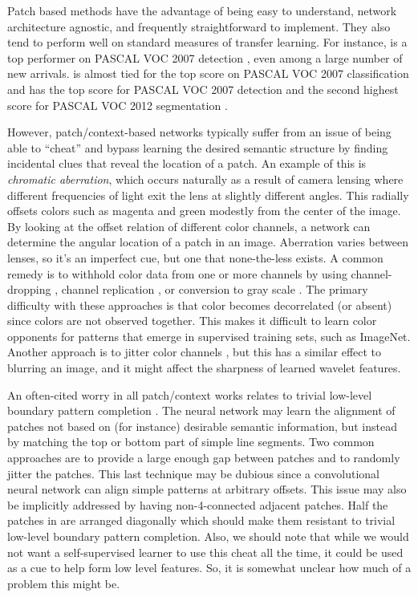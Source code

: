 \documentclass[10pt,twocolumn,letterpaper]{article}
\begin{document}
Patch based methods have the advantage of being easy to understand, network architecture agnostic, and frequently straightforward to implement. They also tend to perform well on standard measures of transfer learning. For instance, \cite{Doersch15} is a top performer on PASCAL VOC 2007 detection \cite{Girshick15}, even among a large number of new arrivals. \cite{Noroozi16b} is almost tied for the top score on PASCAL VOC 2007 classification \cite{Krahenbuhl16} and has the top score for PASCAL VOC 2007 detection and the second highest score for PASCAL VOC 2012 segmentation \cite{Long15,Pathak16}.

However, patch/context-based networks typically suffer from an issue of being able to ``cheat'' and bypass learning the desired semantic structure by finding incidental clues that reveal the location of a patch. An example of this is \emph{chromatic aberration}, which occurs naturally as a result of camera lensing where different frequencies of light exit the lens at slightly different angles. This radially offsets colors such as magenta and green modestly from the center of the image. By looking at the offset relation of different color channels, a network can determine the angular location of a patch in an image. Aberration varies between lenses, so it's an imperfect cue, but one that none-the-less exists. A common remedy is to withhold color data from one or more channels by using channel-dropping \cite{Doersch15,Doersch17}, channel replication \cite{Lee17}, or conversion to gray scale \cite{Noroozi17}.  The primary difficulty with these approaches is that color becomes decorrelated (or absent) since colors are not observed together. This makes it difficult to learn color opponents for patterns that emerge in supervised training sets, such as ImageNet. Another approach is to jitter color channels \cite{Noroozi16a}, but this has a similar effect to blurring an image, and it might affect the sharpness of learned wavelet features.

An often-cited worry in all patch/context works relates to trivial low-level boundary pattern completion \cite{Doersch15,Noroozi16a,Doersch17,Noroozi17,Lee17}. The neural network may learn the alignment of patches not based on (for instance) desirable semantic information, but instead by matching the top or bottom part of simple line segments. Two common approaches are to provide a large enough gap between patches and to randomly jitter the patches. This last technique may be dubious since a convolutional neural network can align simple patterns at arbitrary offsets. This issue may also be implicitly addressed by having non-4-connected adjacent patches. Half the patches in \cite{Doersch15} are arranged diagonally which should make them resistant to trivial low-level boundary pattern completion. Also, we should note that while we would not want a self-supervised learner to use this cheat all the time, it could be used as a cue to help form low level features. So, it is somewhat unclear how much of a problem this might be. 
\end{document}

